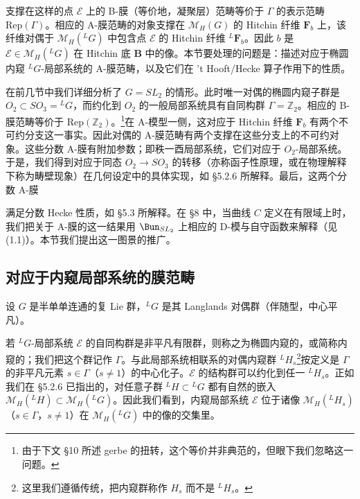 支撑在这样的点 $\mathcal{E}$ 上的 B-膜（等价地，凝聚层）范畴等价于 $\Gamma$ 的表示范畴 $\mathrm{Rep}(\Gamma)$。相应的 A-膜范畴的对象支撑在 $\mathcal{M}_H(G)$ 的 Hitchin 纤维 $\boldsymbol{F}_b$ 上，该纤维对偶于 $\mathcal{M}_H({}^{L}G)$ 中包含点 $\mathcal{E}$ 的 Hitchin 纤维 ${}^{L}\boldsymbol{F}_b$。因此 $b$ 是 $\mathcal{E}\in\mathcal{M}_H({}^{L}G)$ 在 Hitchin 底 $\boldsymbol{B}$ 中的像。本节要处理的问题是：描述对应于椭圆内窥 ${}^{L}G$-局部系统的 A-膜范畴，以及它们在 't Hooft/Hecke 算子作用下的性质。

在前几节中我们详细分析了 $G=SL_2$ 的情形。此时唯一对偶的椭圆内窥子群是 $O_2\subset SO_3={}^{L}G$，而约化到 $O_2$ 的一般局部系统具有自同构群 $\Gamma=\mathbb{Z}_2$。相应的 B-膜范畴等价于 $\mathrm{Rep}(\mathbb{Z}_2)$。\footnote{由于下文 §10 所述 gerbe 的扭转，这个等价并非典范的，但眼下我们忽略这一问题。}在 A-模型一侧，这对应于 Hitchin 纤维 $\boldsymbol{F}_b$ 有两个不可约分支这一事实。因此对偶的 A-膜范畴有两个支撑在这些分支上的不可约对象。这些分数 A-膜有附加参数；即秩一酉局部系统，它们对应于 $O_2$-局部系统。于是，我们得到对应于同态 $O_2\to SO_3$ 的转移（亦称函子性原理，或在物理解释下称为畴壁现象）在几何设定中的具体实现，如 §5.2.6 所解释。最后，这两个分数 A-膜


满足分数 Hecke 性质，如 §5.3 所解释。在 §8 中，当曲线 $C$ 定义在有限域上时，我们把关于 A-膜的这一结果用 $\Bun_{SL_2}$ 上相应的 D-模与自守函数来解释（见 (1.1)）。本节我们提出这一图景的推广。

\subsection{对应于内窥局部系统的膜范畴}

设 $G$ 是半单单连通的复 Lie 群，${}^{L}G$ 是其 Langlands 对偶群（伴随型，中心平凡）。

若 ${}^{L}G$-局部系统 $\mathcal{E}$ 的自同构群是非平凡有限群，则称之为椭圆内窥的，或简称内窥的；我们把这个群记作 $\Gamma$。与此局部系统相联系的对偶内窥群 ${}^{L}H_s$\footnote{这里我们遵循传统，把内窥群称作 $H_s$ 而不是 ${}^{L}H_s$。}按定义是 $\Gamma$ 的非平凡元素 $s\in\Gamma$（$s\neq 1$）的中心化子。$\mathcal{E}$ 的结构群可以约化到任一 ${}^{L}H_s$。正如我们在 §5.2.6 已指出的，对任意子群 ${}^{L}H\subset{}^{L}G$ 都有自然的嵌入 $\mathcal{M}_H({}^{L}H)\subset\mathcal{M}_H({}^{L}G)$。因此我们看到，内窥局部系统 $\mathcal{E}$ 位于诸像 $\mathcal{M}_H({}^{L}H_s)$（$s\in\Gamma$，$s\neq 1$）在 $\mathcal{M}_H({}^{L}G)$ 中的像的交集里。

